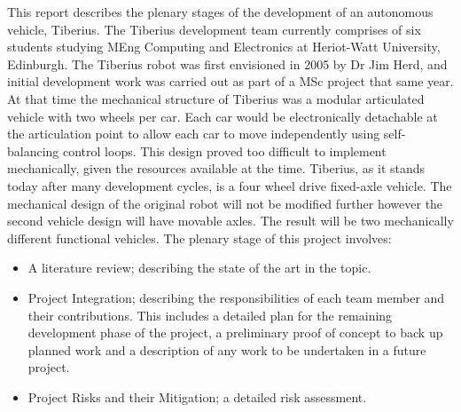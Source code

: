 This report describes the plenary stages of the development of an autonomous vehicle, Tiberius. The Tiberius development team currently comprises of six students studying MEng Computing and Electronics at Heriot-Watt University, Edinburgh.
\newline
The Tiberius robot was first envisioned in 2005 by Dr Jim Herd, and initial development work was carried out as part of a MSc project that same year. At that time the mechanical structure of Tiberius was a modular articulated vehicle with two wheels per car. Each car would be electronically detachable at the articulation point to allow each car to move independently using self-balancing control loops. This design proved too difficult to implement mechanically, given the resources available at the time.
\newline
Tiberius, as it stands today after many development cycles, is a four wheel drive fixed-axle vehicle. The mechanical design of the original robot will not be modified further however the second vehicle design will have movable axles.  The result will be two mechanically different functional vehicles.
\newline
The plenary stage of this project involves:
\begin{itemize}
\item A literature review; describing the state of the art in the topic.
\item Project Integration; describing the responsibilities of each team member and their contributions.  This includes a detailed plan for the remaining development phase of the project, a preliminary proof of concept to back up planned work and a description of any work to be undertaken in a future project.
\item Project Risks and their Mitigation; a detailed risk assessment.
\end{itemize}
\pagebreak
